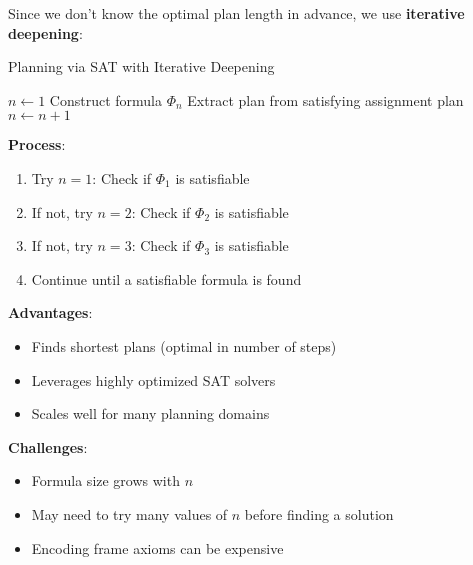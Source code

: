 \documentclass[11pt,a4paper]{article}
\theoremstyle{definition}
\theoremstyle{plain}
\theoremstyle{remark}
\begin{document}
Since we don't know the optimal plan length in advance, we use \textbf{iterative deepening}:

\begin{algorithm}[H]
\caption{Planning via SAT with Iterative Deepening}
\begin{algorithmic}[1]
\STATE $n \leftarrow 1$
    \STATE Construct formula $\Phi_n$
        \STATE Extract plan from satisfying assignment
        \RETURN plan
    \ENDIF
    \STATE $n \leftarrow n + 1$
\ENDWHILE
\end{algorithmic}
\end{algorithm}

\textbf{Process}:
\begin{enumerate}
    \item Try $n = 1$: Check if $\Phi_1$ is satisfiable
    \item If not, try $n = 2$: Check if $\Phi_2$ is satisfiable
    \item If not, try $n = 3$: Check if $\Phi_3$ is satisfiable
    \item Continue until a satisfiable formula is found
\end{enumerate}

\textbf{Advantages}:
\begin{itemize}
    \item Finds shortest plans (optimal in number of steps)
    \item Leverages highly optimized SAT solvers
    \item Scales well for many planning domains
\end{itemize}

\textbf{Challenges}:
\begin{itemize}
    \item Formula size grows with $n$
    \item May need to try many values of $n$ before finding a solution
    \item Encoding frame axioms can be expensive
\end{itemize}
\end{document}
